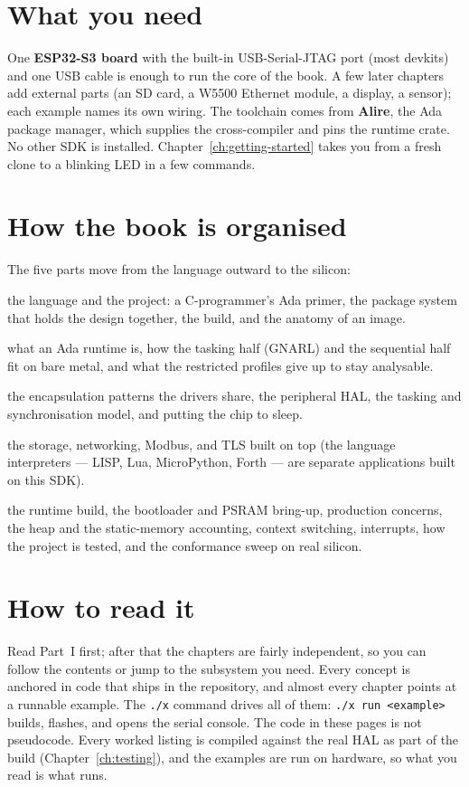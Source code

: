 \section*{What you need}

One \textbf{ESP32-S3 board} with the built-in USB-Serial-JTAG port (most devkits)
and one USB cable is enough to run the core of the book. A few later chapters add
external parts (an SD card, a W5500 Ethernet module, a display, a sensor); each
example names its own wiring. The toolchain comes from \textbf{Alire}, the Ada
package manager, which supplies the cross-compiler and pins the runtime crate. No
other SDK is installed. Chapter~\ref{ch:getting-started} takes you from a fresh
clone to a blinking LED in a few commands.

\section*{How the book is organised}

The five parts move from the language outward to the silicon:

\begin{description}[style=nextline, leftmargin=0pt]
\item[Part I, Ada on Bare Metal] the language and the project: a C-programmer's
  Ada primer, the package system that holds the design together, the build, and the
  anatomy of an image.
\item[Part II, The Runtime] what an Ada runtime is, how the tasking half (GNARL)
  and the sequential half fit on bare metal, and what the restricted profiles give
  up to stay analysable.
\item[Part III, Talking to Hardware] the encapsulation patterns the drivers share,
  the peripheral HAL, the tasking and synchronisation model, and putting the chip
  to sleep.
\item[Part IV, Building Real Systems] the storage, networking, Modbus, and TLS
  built on top (the language interpreters --- LISP, Lua, MicroPython, Forth ---
  are separate applications built on this SDK).
\item[Part V, Under the Hood] the runtime build, the bootloader and PSRAM bring-up,
  production concerns, the heap and the static-memory accounting, context switching,
  interrupts, how the project is tested, and the conformance sweep on real silicon.
\end{description}

\section*{How to read it}

Read Part~I first; after that the chapters are fairly independent, so you can follow
the contents or jump to the subsystem you need. Every concept is anchored in code
that ships in the repository, and almost every chapter points at a runnable example.
The \texttt{./x} command drives all of them: \texttt{./x run <example>} builds,
flashes, and opens the serial console. The code in these pages is not pseudocode.
Every worked listing is compiled against the real HAL as part of the build
(Chapter~\ref{ch:testing}), and the examples are run on hardware, so what you read
is what runs.
